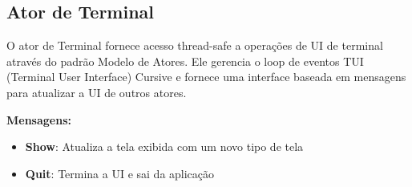 \subsection{Ator de Terminal}

O ator de Terminal fornece acesso thread-safe a operações de UI de terminal através do padrão Modelo de Atores. Ele gerencia o loop de eventos TUI (Terminal User Interface) Cursive e fornece uma interface baseada em mensagens para atualizar a UI de outros atores.

\textbf{Mensagens:}

\begin{itemize}
    \item \textbf{Show}: Atualiza a tela exibida com um novo tipo de tela
    \item \textbf{Quit}: Termina a UI e sai da aplicação
\end{itemize}
